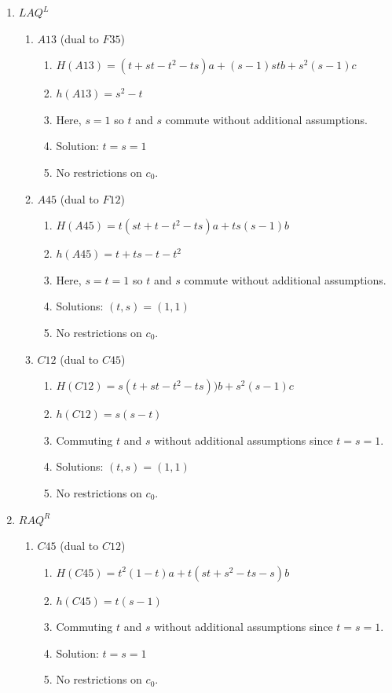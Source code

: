 \documentclass[11pt]{amsart}
\theoremstyle{definition}
\begin{document}
\begin{enumerate}
\item[(21)] $LAQ^L$
        \begin{enumerate}
            \item $A13$ (dual to $F35$)
            \begin{enumerate}
                \item  $H(A13) = (t+st-t^2-ts)a+(s-1)stb+s^2(s-1)c$
                \item  $h(A13) = s^2-t$
                \item Here, $s=1$ so $t$ and $s$ commute without additional assumptions.
                \item Solution: $t=s=1$ 
                \item No restrictions on $c_0$.
            \end{enumerate}

             \item $A45$ (dual to $F12$)
            \begin{enumerate}
                \item  $H(A45) = t(st + t - t^2 -ts)a + ts(s - 1) b$
                \item  $h(A45) = t+ts-t-t^2$
                \item Here, $s=t=1$ so $t$ and $s$ commute without additional assumptions.
                \item Solutions: $(t,s) = ( 1, 1)$ 
                \item No restrictions on $c_0$.
            \end{enumerate}


             \item $C12$ (dual to $C45$)
            \begin{enumerate}
                \item  $H(C12) = s(t+st-t^2 -ts))b +s^2(s-1)c$
                \item     $h(C12) = s(s-t)$
                \item Commuting $t$ and $s$ without additional assumptions since $t=s=1$.
                \item Solutions: $(t,s) = ( 1, 1)$ 
                \item No restrictions on $c_0$.
            \end{enumerate}
        \end{enumerate}

        \item[(22)] $RAQ^R$
        \begin{enumerate}
            \item $C45$ (dual to $C12$)
            \begin{enumerate}
                \item $H(C45) = t^2(1-t)a+t(st+s^2-ts-s)b$
                \item $h(C45) = t(s-1)$
                \item Commuting $t$ and $s$ without additional assumptions since $t=s=1$.
                \item Solution: $t=s=1$ 
                \item No restrictions on $c_0$.
            \end{enumerate}


\end{enumerate}
\end{enumerate}
\end{document}
